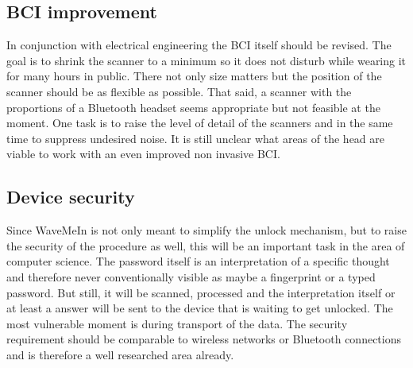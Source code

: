 \subsection{BCI improvement}
In conjunction with electrical engineering the BCI itself should be revised. The goal is to shrink the scanner to a minimum so it does not disturb while wearing it for many hours in public. There not only size matters but the position of the scanner should be as flexible as possible. That said, a scanner with the proportions of a Bluetooth headset seems appropriate but not feasible at the moment. One task is to raise the level of detail of the scanners and in the same time to suppress undesired noise. It is still unclear what areas of the head are viable to work with an even improved non invasive BCI.

\subsection{Device security}
Since WaveMeIn is not only meant to simplify the unlock mechanism, but to raise the security of the procedure as well, this will be an important task in the area of computer science. The password itself is an interpretation of a specific thought and therefore never conventionally visible as maybe a fingerprint or a typed password. But still, it will be scanned, processed and the interpretation itself or at least a answer will be sent to the device that is waiting to get unlocked. The most vulnerable moment is during transport of the data. The security requirement should be comparable to wireless networks or Bluetooth connections and is therefore a well researched area already.




